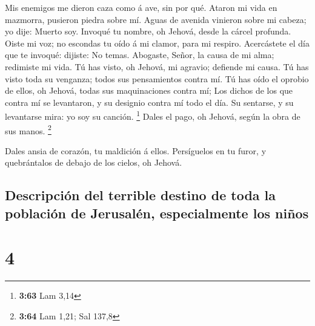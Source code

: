  Mis enemigos me dieron caza como á ave, sin por qué.
 Ataron mi vida en mazmorra, pusieron piedra sobre mí.
 Aguas de avenida vinieron sobre mi cabeza; yo dije: Muerto
soy.  Invoqué tu nombre, oh Jehová, desde la cárcel
profunda.  Oiste mi voz; no escondas tu oído á mi clamor,
para mi respiro.  Acercástete el día que te invoqué:
dijiste: No temas.  Abogaste, Señor, la causa de mi alma;
redimiste mi vida.  Tú has visto, oh Jehová, mi agravio;
defiende mi causa.  Tú has visto toda su venganza; todos
sus pensamientos contra mí.  Tú has oído el oprobio de
ellos, oh Jehová, todas sus maquinaciones contra mí;  Los
dichos de los que contra mí se levantaron, y su designio contra mí todo
el día.  Su sentarse, y su levantarse mira: yo soy su
canción. \footnote{\textbf{3:63} Lam 3,14}  Dales el pago,
oh Jehová, según la obra de sus manos. \footnote{\textbf{3:64} Lam 1,21;
  Sal 137,8}

 Dales ansia de corazón, tu maldición á ellos.
 Persíguelos en tu furor, y quebrántalos de debajo de los
cielos, oh Jehová.

\hypertarget{descripciuxf3n-del-terrible-destino-de-toda-la-poblaciuxf3n-de-jerusaluxe9n-especialmente-los-niuxf1os}{%
\subsection{Descripción del terrible destino de toda la población de
Jerusalén, especialmente los
niños}\label{descripciuxf3n-del-terrible-destino-de-toda-la-poblaciuxf3n-de-jerusaluxe9n-especialmente-los-niuxf1os}}

\hypertarget{section-3}{%
\section{4}\label{section-3}}

